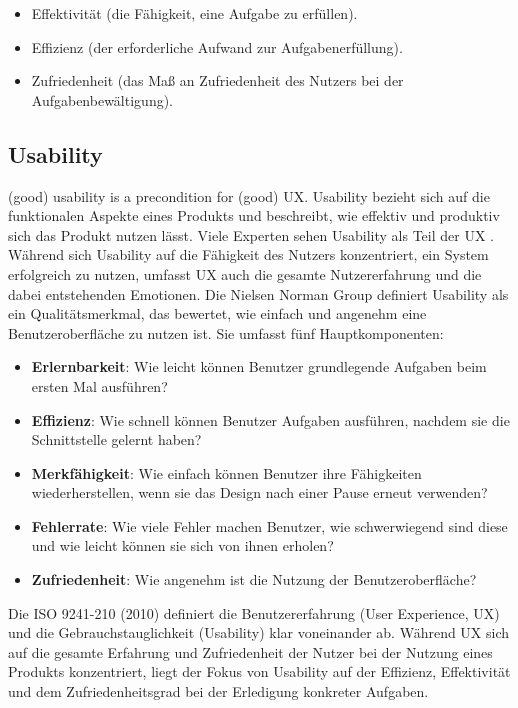 \documentclass[12pt,oneside]{article}
\begin{document}
\begin{itemize} \item Effektivität (die Fähigkeit, eine Aufgabe zu erfüllen). \item Effizienz (der erforderliche Aufwand zur Aufgabenerfüllung). \item Zufriedenheit (das Maß an Zufriedenheit des Nutzers bei der Aufgabenbewältigung). \end{itemize}

\subsection{Usability}
 (good) usability is a precondition
for (good) UX.\cite{glanznig}
Usability bezieht sich auf die funktionalen Aspekte eines Produkts und beschreibt, wie effektiv und produktiv sich das Produkt nutzen lässt. Viele Experten sehen Usability als Teil der UX \cite{GOISTAI}. Während sich Usability auf die Fähigkeit des Nutzers konzentriert, ein System erfolgreich zu nutzen, umfasst UX auch die gesamte Nutzererfahrung und die dabei entstehenden Emotionen.
Die Nielsen Norman Group definiert \cite{nngroup} Usability als ein Qualitätsmerkmal, das bewertet, wie einfach und angenehm eine Benutzeroberfläche zu nutzen ist. Sie umfasst fünf Hauptkomponenten:
\begin{itemize}
    \item \textbf{Erlernbarkeit}: Wie leicht können Benutzer grundlegende Aufgaben beim ersten Mal ausführen?
    \item \textbf{Effizienz}: Wie schnell können Benutzer Aufgaben ausführen, nachdem sie die Schnittstelle gelernt haben?
    \item \textbf{Merkfähigkeit}: Wie einfach können Benutzer ihre Fähigkeiten wiederherstellen, wenn sie das Design nach einer Pause erneut verwenden?
    \item \textbf{Fehlerrate}: Wie viele Fehler machen Benutzer, wie schwerwiegend sind diese und wie leicht können sie sich von ihnen erholen?
    \item \textbf{Zufriedenheit}: Wie angenehm ist die Nutzung der Benutzeroberfläche?
\end{itemize}
Die ISO 9241-210 (2010) definiert die Benutzererfahrung (User Experience, UX) und die Gebrauchstauglichkeit (Usability) klar voneinander ab. Während UX sich auf die gesamte Erfahrung und Zufriedenheit der Nutzer bei der Nutzung eines Produkts konzentriert, liegt der Fokus von Usability auf der Effizienz, Effektivität und dem Zufriedenheitsgrad bei der Erledigung konkreter Aufgaben.
\end{document}
